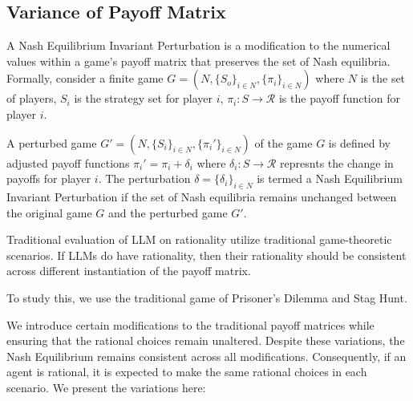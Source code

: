 \subsection{Variance of Payoff Matrix}
\begin{definition}
A Nash Equilibrium Invariant Perturbation is a modification to the numerical values within a game's payoff matrix that preserves the set of Nash equilibria. Formally, consider a finite game $G = (N, \{S_o\}_{i\in N}, \{\pi_i\}_{i\in N})$ where $N$ is the set of players, $S_i$ is the strategy set for player $i$, $\pi_i: S\to\mathcal{R}$ is the payoff function for player $i$.

A perturbed game $G' = (N, \{S_i\}_{i\in N}, \{\pi_i'\}_{i\in N})$ of the game $G$ is defined by adjusted payoff functions $\pi_i' = \pi_i + \delta_i$ where $\delta_i: S\to \mathcal{R}$ represnts the change in payoffs for player $i$. The perturbation $\delta = \{\delta_i\}_{i\in N}$ is termed a Nash Equilibrium Invariant Perturbation if the set of Nash equilibria remains unchanged between the original game $G$ and the perturbed game $G'$.
\end{definition}

Traditional evaluation of LLM on rationality utilize traditional game-theoretic scenarios. If LLMs do have rationality, then their rationality should be consistent across different instantiation of the payoff matrix. 

To study this, we use the traditional game of Prisoner's Dilemma and Stag Hunt.


We introduce certain modifications to the traditional payoff matrices while ensuring that the rational choices remain unaltered. Despite these variations, the Nash Equilibrium remains consistent across all modifications. Consequently, if an agent is rational, it is expected to make the same rational choices in each scenario. We present the variations here:


